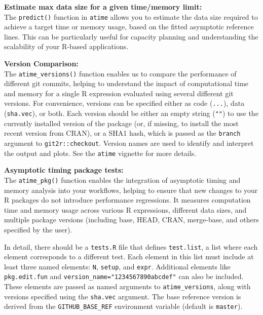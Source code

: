 \textbf{Estimate max data size for a given time/memory limit:} \\
The \texttt{predict()} function in \texttt{atime} allows you to estimate the data size required to achieve a target time or memory usage, based on the fitted asymptotic reference lines. This can be particularly useful for capacity planning and understanding the scalability of your R-based applications.
\vspace{0.1in}

\textbf{Version Comparison:} \\
The \texttt{atime\_versions()} function enables us to compare the performance of different git commits, helping to understand the impact of computational time and memory for a single R expression evaluated using several different git versions.
For convenience, versions can be specified either as code (\texttt{...}), data (\texttt{sha.vec}), or both. Each version should be either an empty string (\texttt{""}) to use the currently installed version of the package (or, if missing, to install the most recent version from CRAN), or a SHA1 hash, which is passed as the \texttt{branch} argument to \texttt{git2r::checkout}. Version names are used to identify and interpret the output and plots. See the \texttt{atime} vignette for more details.

\vspace{0.1in}

\textbf{Asymptotic timing package tests:} \\

The \texttt{atime\_pkg()} function enables the integration of asymptotic timing and memory analysis into your workflows, helping to ensure that new changes to your R packages do not introduce performance regressions. It measures computation time and memory usage across various R expressions, different data sizes, and multiple package versions (including base, HEAD, CRAN, merge-base, and others specified by the user).

In detail, there should be a \texttt{tests.R} file that defines \texttt{test.list}, a list where each element corresponds to a different test. Each element in this list must include at least three named elements: \texttt{N}, \texttt{setup}, and \texttt{expr}. Additional elements like \texttt{pkg.edit.fun} and \texttt{version\_name="1234567890abcdef"} can also be included. These elements are passed as named arguments to \texttt{atime\_versions}, along with versions specified using the \texttt{sha.vec} argument. The base reference version is derived from the \texttt{GITHUB\_BASE\_REF} environment variable (default is \texttt{master}).

